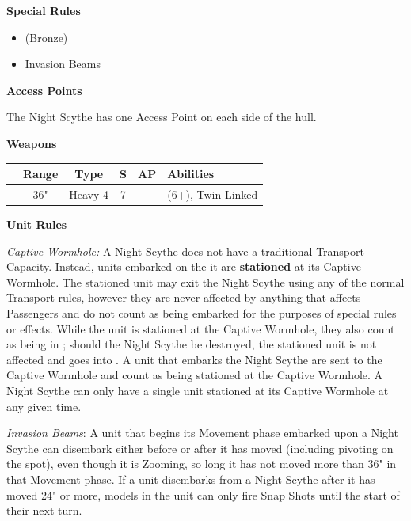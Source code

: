 \begin{minipage}[t]{0.72\textwidth}
\begin{minipage}[t]{0.5\textwidth}
\begin{flushleft}
			\textbf{Special Rules}
			\begin{itemize}
				\item {} (Bronze)
				\item Invasion Beams
			\end{itemize}
		\end{flushleft}
	\end{minipage}
	
	\vspace*{2em}
	\textbf{Access Points}
	
	The Night Scythe has one Access Point on each side of the hull.
	
	\vspace*{2em}
	\textbf{Weapons}
	
	\begin{tabular}{m{95 pt} *{4}{c} >{\raggedright\arraybackslash}p{130pt}}
		& Range & Type & S & AP & Abilities \\
		\hline
		\quickref{Tesla Destructor} & 36" & Heavy 4 & 7 & — & \quickref{Tesla} (6+), Twin-Linked
	\end{tabular}
	
	\vspace*{2em}
	\textbf{Unit Rules}
	
	\textit{Captive Wormhole:} A Night Scythe does not have a traditional Transport Capacity. Instead, units embarked on the it are \textbf{stationed} at its Captive Wormhole. The stationed unit may exit the Night Scythe using any of the normal Transport rules, however they are never affected by anything that affects Passengers and do not count as being embarked for the purposes of special rules or effects. While the unit is stationed at the Captive Wormhole, they also count as being in ; should the Night Scythe be destroyed, the stationed unit is not affected and goes into . A unit that embarks the Night Scythe are sent to the Captive Wormhole and count as being stationed at the Captive Wormhole. A Night Scythe can only have a single unit stationed at its Captive Wormhole at any given time.
	
	\textit{Invasion Beams}: A unit that begins its Movement phase embarked upon a Night Scythe can disembark either before or after it has moved (including pivoting on the spot), even though it is Zooming, so long it has not moved more than 36" in that Movement phase. If a unit disembarks from a Night Scythe after it has moved 24" or more, models in the unit can only fire Snap Shots until the start of their next turn.
\end{minipage}


